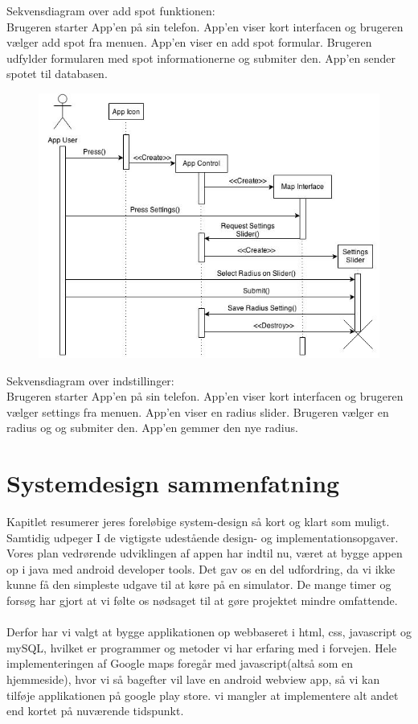 \documentclass[12pt]{article}
\begin{document}
Sekvensdiagram over add spot funktionen:\\
Brugeren starter App'en på sin telefon. App'en viser kort interfacen og brugeren vælger add spot fra menuen.
App'en viser en add spot formular. Brugeren udfylder formularen med spot informationerne og submiter den.
App'en sender spotet til databasen.

\newpage

\begin{figure}[h]
\includegraphics[scale = 0.5]{sekdia3}
\end{figure}

Sekvensdiagram over indstillinger:\\
Brugeren starter App'en på sin telefon. App'en viser kort interfacen og brugeren vælger settings fra menuen.
App'en viser en radius slider. Brugeren vælger en radius og og submiter den. App'en gemmer den nye radius.


\pagebreak

\section{Systemdesign sammenfatning}
Kapitlet resumerer jeres foreløbige system-design så kort og klart som muligt. Samtidig
udpeger I de vigtigste udestående design- og implementationsopgaver.\\

Vores plan vedrørende udviklingen af appen har indtil nu, været at bygge appen op i java med android developer tools. Det gav os en del udfordring, da vi ikke kunne få den simpleste udgave til at køre på en simulator. De mange timer og forsøg har gjort at vi følte os nødsaget til at gøre projektet mindre omfattende. 
\\\\
Derfor har vi valgt at bygge applikationen op webbaseret i html, css, javascript og mySQL, hvilket er programmer og metoder vi har erfaring med i forvejen. 
Hele implementeringen af Google maps foregår med javascript(altså som en hjemmeside), hvor vi så bagefter vil lave en android webview app, så vi kan tilføje applikationen på google play store. vi mangler at implementere alt andet end kortet på nuværende tidspunkt.
\end{document}
